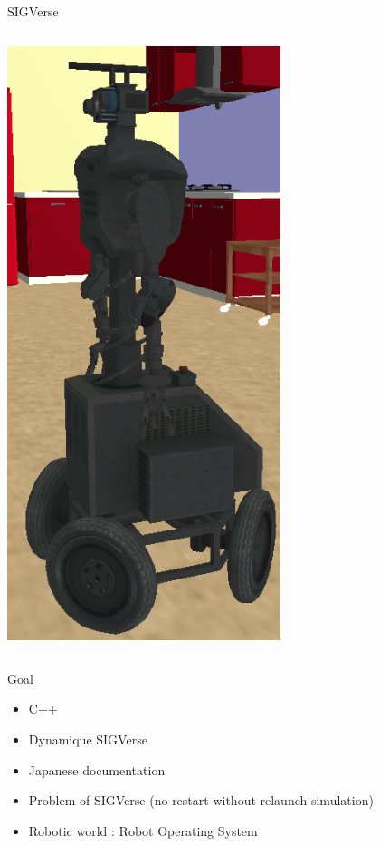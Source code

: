 \documentclass[11pt]{beamer}
\begin{document}
\begin{frame}{SIGVerse}
\begin{columns}[t]
\begin{column}[T]{.4\textwidth}
		\includegraphics[width=0.6\textwidth]{images/robot_000_sigverse.png}
	\end{column}
\end{columns}
\end{frame}

\begin{frame}{Goal}
	\begin{itemize}
		\item C++
		\item Dynamique SIGVerse
		\item Japanese documentation
		\item Problem of SIGVerse (no restart without relaunch simulation)
		\item Robotic world : Robot Operating System
	\end{itemize}
\end{frame}
\end{document}
